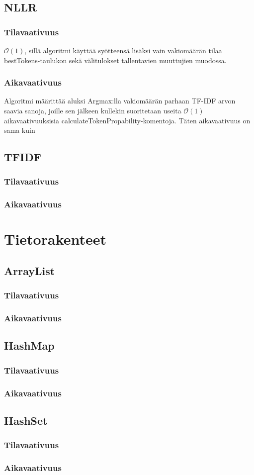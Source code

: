 \documentclass[12pt,a4paper]{article}
\begin{document}
\subsection{NLLR}
\subsubsection{Tilavaativuus}
$\mathcal{O}(1)$, sillä algoritmi käyttää syötteensä lisäksi vain vakiomäärän tilaa bestTokens-taulukon sekä välitulokset tallentavien muuttujien muodossa.
\subsubsection{Aikavaativuus}
Algoritmi määrittää aluksi Argmax:lla vakiomäärän parhaan TF-IDF arvon saavia sanoja, joille sen jälkeen kullekin suoritetaan useita $\mathcal{O}(1)$ aikavaativuuksisia calculateTokenPropability-komentoja. Täten aikavaativuus on sama kuin  
\subsection{TFIDF}
\subsubsection{Tilavaativuus}
\subsubsection{Aikavaativuus}



\section{Tietorakenteet}

\subsection{ArrayList}
\subsubsection{Tilavaativuus}
\subsubsection{Aikavaativuus}

\subsection{HashMap}
\subsubsection{Tilavaativuus}
\subsubsection{Aikavaativuus}

\subsection{HashSet}
\subsubsection{Tilavaativuus}
\subsubsection{Aikavaativuus}
\end{document}

